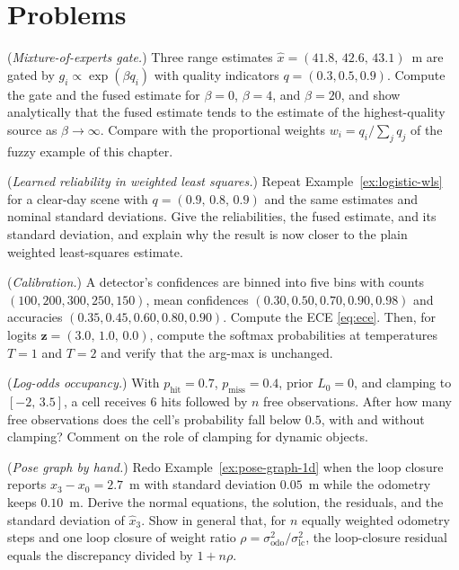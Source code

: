 \documentclass[graybox,envcountchap]{style/SNmono}
\newcommand{\problemsection}{\section*{Problems}\addcontentsline{toc}{section}{Problems}}
\begin{document}
\problemsection
\begin{prob}\label{prob:ch04:1}
(\emph{Mixture-of-experts gate.}) Three range estimates $\widehat{x}=(41.8,\,42.6,\,43.1)$~m are gated by $g_i\propto\exp(\beta q_i)$ with quality indicators $q=(0.3,0.5,0.9)$. Compute the gate and the fused estimate for $\beta=0$, $\beta=4$, and $\beta=20$, and show analytically that the fused estimate tends to the estimate of the highest-quality source as $\beta\to\infty$. Compare with the proportional weights $w_i=q_i/\sum_j q_j$ of the fuzzy example of this chapter.
\end{prob}
\begin{prob}\label{prob:ch04:2}
(\emph{Learned reliability in weighted least squares.}) Repeat Example~\ref{ex:logistic-wls} for a clear-day scene with $q=(0.9,\,0.8,\,0.9)$ and the same estimates and nominal standard deviations. Give the reliabilities, the fused estimate, and its standard deviation, and explain why the result is now closer to the plain weighted least-squares estimate.
\end{prob}
\begin{prob}\label{prob:ch04:3}
(\emph{Calibration.}) A detector's confidences are binned into five bins with counts $(100,200,300,250,150)$, mean confidences $(0.30,0.50,0.70,0.90,0.98)$ and accuracies $(0.35,0.45,0.60,0.80,0.90)$. Compute the ECE \eqref{eq:ece}. Then, for logits $\mathbf{z}=(3.0,\,1.0,\,0.0)$, compute the softmax probabilities at temperatures $T=1$ and $T=2$ and verify that the arg-max is unchanged.
\end{prob}
\begin{prob}\label{prob:ch04:4}
(\emph{Log-odds occupancy.}) With $p_{\mathrm{hit}}=0.7$, $p_{\mathrm{miss}}=0.4$, prior $L_0=0$, and clamping to $[-2,\,3.5]$, a cell receives $6$ hits followed by $n$ free observations. After how many free observations does the cell's probability fall below $0.5$, with and without clamping? Comment on the role of clamping for dynamic objects.
\end{prob}
\begin{prob}\label{prob:ch04:5}
(\emph{Pose graph by hand.}) Redo Example~\ref{ex:pose-graph-1d} when the loop closure reports $x_3-x_0=2.7$~m with standard deviation $0.05$~m while the odometry keeps $0.10$~m. Derive the normal equations, the solution, the residuals, and the standard deviation of $\widehat{x}_3$. Show in general that, for $n$ equally weighted odometry steps and one loop closure of weight ratio $\rho=\sigma_{\mathrm{odo}}^{2}/\sigma_{\mathrm{lc}}^{2}$, the loop-closure residual equals the discrepancy divided by $1+n\rho$.
\end{prob}
\end{document}
